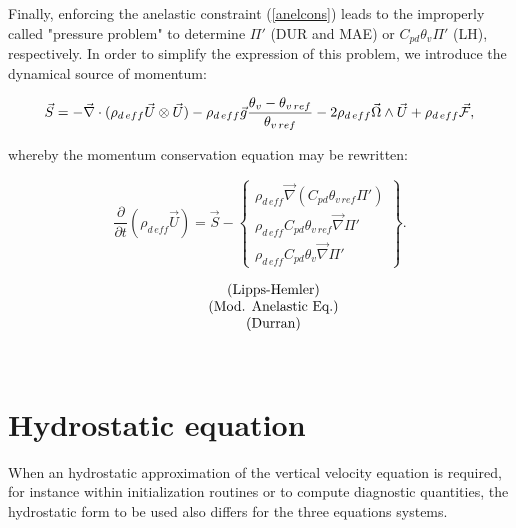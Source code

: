 Finally, enforcing the anelastic constraint (\ref{anelcons}) leads to the improperly
called "pressure problem" to determine $\Pi '$ (DUR and MAE) or $C_{pd} \theta_{v}  \Pi ' $
(LH), respectively. In order to simplify the expression of this problem, we introduce the
dynamical source of momentum:

\begin{equation}
\vec{S} = - \vec{ \nabla} \cdot
(\rho_{d\,eff} \vec{U}\otimes \vec{U} )
 - \rho_{d\,eff}  \vec{g} \dfrac{\theta_v-\theta_{v\,ref}}{\theta_{v\,ref}}
- 2\rho_{d\,eff} \vec{\Omega} \wedge\vec{U}  + \rho_{d\,eff} \vec{\cal F} ,
\end{equation}

whereby the momentum conservation equation may be rewritten:

%
\parbox{9cm}{
\begin{displaymath}
\dfrac{\partial}{\partial t}(\rho_{d\,eff} \vec{U})   =
\vec{S} - \left\{
\begin{array}{c}
\rho_{d\,eff}  \vec{ \nabla}(C_{pd} \theta_{v\,ref} \Pi ')\\
\rho_{d\,eff} C_{pd} \theta_{v\,ref} \vec{ \nabla} \Pi '  \\
\rho_{d\,eff} C_{pd} \theta_{v} \vec{ \nabla} \Pi '
\end{array}
\right\}.
\end{displaymath}
}
\hfill
\parbox{5cm}{
\begin{displaymath}
\begin{array}{c@{\quad}c}
\quad &\mbox{(Lipps-Hemler)} \\
\quad &\mbox{(Mod. Anelastic Eq.)} \\
\quad &\mbox{(Durran)}
\end{array}
\end{displaymath}
}
\hfill
\parbox{1cm}{
\begin{eqnarray}
\ \label{LhMom} \\ \label{MAEMom}   \\ \label{DuMom}
\end{eqnarray}
}
%

\section{Hydrostatic equation}

When an hydrostatic approximation of the vertical velocity
equation is required, for instance  within initialization routines or to compute
diagnostic quantities,
the hydrostatic form to be used also differs for the three equations systems.\\

